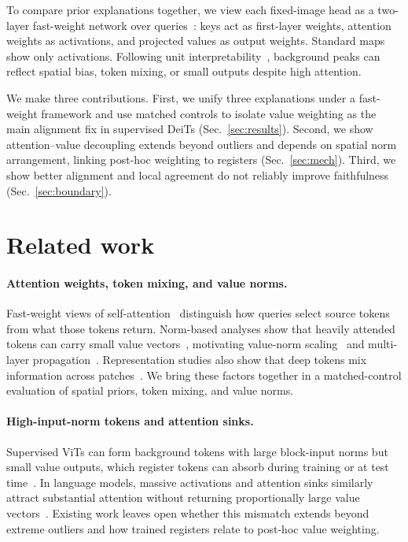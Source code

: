 \documentclass{article}
\begin{document}
To compare prior explanations together, we view each fixed-image head as a two-layer fast-weight network over queries~\citep{schmidhuber1992,schlag2021,wen2026mita}: keys act as first-layer weights, attention weights as activations, and projected values as output weights. Standard maps show only activations. Following unit interpretability~\citep{bau2017}, background peaks can reflect spatial bias, token mixing, or small outputs despite high attention.

We make three contributions. First, we unify three explanations under a fast-weight framework and use matched controls to isolate value weighting as the main alignment fix in supervised DeiTs (Sec.~\ref{sec:results}). Second, we show attention--value decoupling extends beyond outliers and depends on spatial norm arrangement, linking post-hoc weighting to registers (Sec.~\ref{sec:mech}). Third, we show better alignment and local agreement do not reliably improve faithfulness (Sec.~\ref{sec:boundary}).

\section{Related work}
\paragraph{Attention weights, token mixing, and value norms.} Fast-weight views of self-attention~\citep{schmidhuber1992,schlag2021,wen2026mita} distinguish how queries select source tokens from what those tokens return. Norm-based analyses show that heavily attended tokens can carry small value vectors~\citep{kobayashi2020}, motivating value-norm scaling~\citep{zhu2024} and multi-layer propagation~\citep{abnar2020,chefer2021generic,wu2024tokentm}. Representation studies also show that deep tokens mix information across patches~\citep{brunner2020,raghu2021}. We bring these factors together in a matched-control evaluation of spatial priors, token mixing, and value norms.

\paragraph{High-input-norm tokens and attention sinks.} Supervised ViTs can form background tokens with large block-input norms but small value outputs, which register tokens can absorb during training or at test time~\citep{darcet2024,jiang2025}. In language models, massive activations and attention sinks similarly attract substantial attention without returning proportionally large value vectors~\citep{sun2024massive,xiao2024sinks,gu2025sink}. Existing work leaves open whether this mismatch extends beyond extreme outliers and how trained registers relate to post-hoc value weighting.
\end{document}
